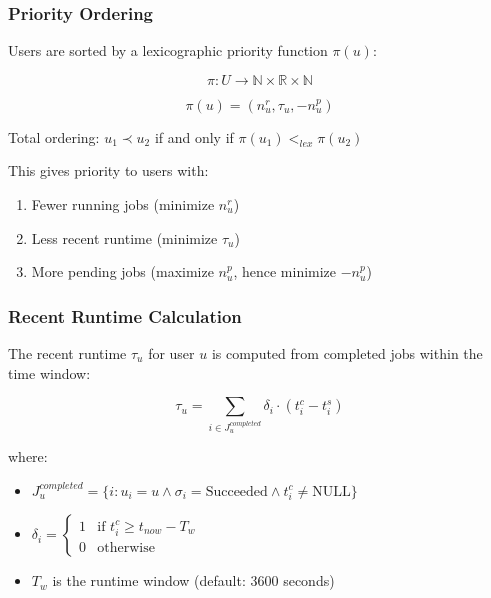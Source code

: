 \documentclass[11pt]{article}
\begin{document}
\subsubsection{Priority Ordering}

Users are sorted by a lexicographic priority function $\pi(u)$:

\begin{equation}
\pi: U \to \mathbb{N} \times \mathbb{R} \times \mathbb{N}
\end{equation}

\begin{equation}
\pi(u) = (n_u^r, \tau_u, -n_u^p)
\end{equation}

Total ordering: $u_1 \prec u_2$ if and only if $\pi(u_1) <_{lex} \pi(u_2)$

This gives priority to users with:
\begin{enumerate}
\item Fewer running jobs (minimize $n_u^r$)
\item Less recent runtime (minimize $\tau_u$)
\item More pending jobs (maximize $n_u^p$, hence minimize $-n_u^p$)
\end{enumerate}

\subsubsection{Recent Runtime Calculation}

The recent runtime $\tau_u$ for user $u$ is computed from completed jobs within the time window:

\begin{equation}
\tau_u = \sum_{i \in J_u^{completed}} \delta_i \cdot (t_i^c - t_i^s)
\end{equation}

where:
\begin{itemize}
\item $J_u^{completed} = \{i : u_i = u \land \sigma_i = \text{Succeeded} \land t_i^c \neq \text{NULL}\}$
\item $\delta_i = \begin{cases}
  1 & \text{if } t_i^c \geq t_{now} - T_w \\
  0 & \text{otherwise}
  \end{cases}$
\item $T_w$ is the runtime window (default: 3600 seconds)
\end{itemize}
\end{document}
